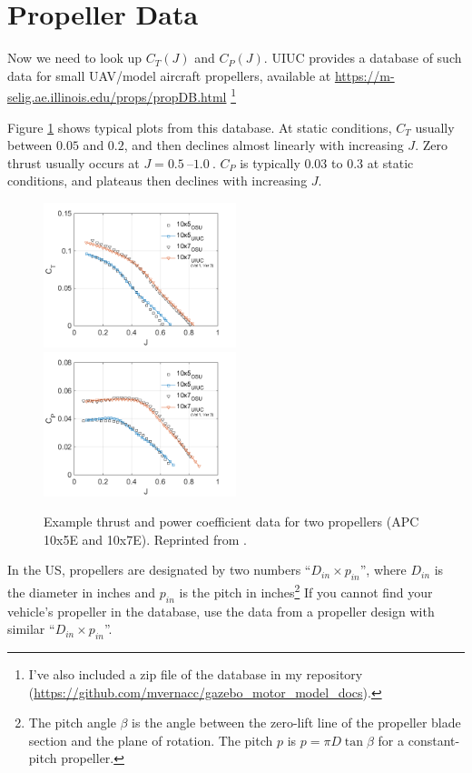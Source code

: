 \documentclass[12pt]{article}
\begin{document}
\section{Propeller Data} \label{sec:propeller_data}

Now we need to look up $C_T(J)$ and $C_P(J)$. UIUC provides a database of such data for small UAV/model aircraft propellers, available at \url{https://m-selig.ae.illinois.edu/props/propDB.html} \footnote{I've also included a zip file of the database in my repository (\url{https://github.com/mvernacc/gazebo_motor_model_docs}).}

Figure \ref{fig:prop_data_example} shows typical plots from this database. At static conditions, $C_T$ usually between $0.05$ and $0.2$, and then declines almost linearly with increasing $J$. Zero thrust usually occurs at $J = \SIrange{0.5}{1.0}{}$. $C_P$ is typically $0.03$ to $0.3$ at static conditions, and plateaus then declines with increasing $J$.

\begin{figure}
    \includegraphics[width=0.5\textwidth]{UIUC-OSU-APC-E-comparison-June-2015-CT.png}
    \includegraphics[width=0.5\textwidth]{UIUC-OSU-APC-E-comparison-June-2015-CP.png}
    \caption{\label{fig:prop_data_example} Example thrust and power coefficient data for two propellers (APC 10x5E and 10x7E). Reprinted from \cite{UIUCdatabase}.}
\end{figure}

In the US, propellers are designated by two numbers ``$D_{in} \times p_{in}$'', where $D_{in}$ is the diameter in inches and $p_{in}$ is the pitch in inches\footnote{The pitch angle $\beta$ is the angle between the zero-lift line of the propeller blade section and the plane of rotation. The pitch $p$ is $p = \pi D \tan \beta$ for a constant-pitch propeller.} If you cannot find your vehicle's propeller in the database, use the data from a propeller design with similar ``$D_{in} \times p_{in}$''.
\end{document}
